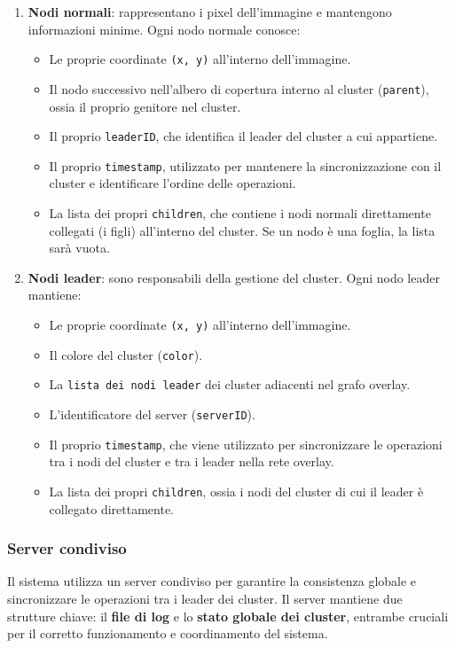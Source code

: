 \documentclass[12pt, a4paper]{report}
\begin{document}
\begin{enumerate}
    \item \textbf{Nodi normali}: rappresentano i pixel dell'immagine e mantengono informazioni minime. Ogni nodo normale conosce:
    \begin{itemize}
        \item Le proprie coordinate \texttt{(x, y)} all'interno dell'immagine.
        \item Il nodo successivo nell'albero di copertura interno al cluster (\texttt{parent}), ossia il proprio genitore nel cluster.
        \item Il proprio \texttt{leaderID}, che identifica il leader del cluster a cui appartiene.
        \item Il proprio \texttt{timestamp}, utilizzato per mantenere la sincronizzazione con il cluster e identificare l'ordine delle operazioni.
         \item La lista dei propri \texttt{children}, che contiene i nodi normali direttamente collegati (i figli) all'interno del cluster. Se un nodo \`e una foglia, la lista sar\`a vuota.
    \end{itemize}

    \item \textbf{Nodi leader}: sono responsabili della gestione del cluster. Ogni nodo leader mantiene:
    \begin{itemize}
        \item Le proprie coordinate \texttt{(x, y)} all'interno dell'immagine.
        \item Il colore del cluster (\texttt{color}).
        \item La \texttt{lista dei nodi leader} dei cluster adiacenti nel grafo overlay.
        \item L'identificatore del server (\texttt{serverID}).
        \item Il proprio \texttt{timestamp}, che viene utilizzato per sincronizzare le operazioni tra i nodi del cluster e tra i leader nella rete overlay.
        \item La lista dei propri \texttt{children}, ossia i nodi del cluster di cui il leader \`e collegato direttamente.
    \end{itemize}
\end{enumerate}

\subsubsection{Server condiviso} 
Il sistema utilizza un server condiviso per garantire la consistenza globale e sincronizzare le operazioni tra i leader dei cluster. Il server mantiene due strutture chiave: il \textbf{file di log} e lo \textbf{stato globale dei cluster}, entrambe cruciali per il corretto funzionamento e coordinamento del sistema.
\end{document}
